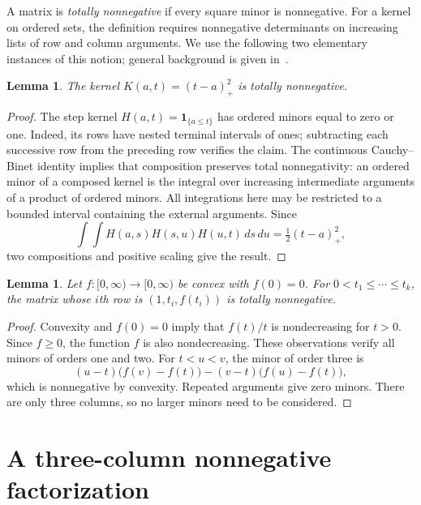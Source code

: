 \documentclass[11pt]{article}
\newtheorem{lemma}[theorem]{Lemma}
\theoremstyle{remark}
\begin{document}
A matrix is \emph{totally nonnegative} if every square minor is nonnegative.
For a kernel on ordered sets, the definition requires nonnegative determinants
on increasing lists of row and column arguments. We use the following two
elementary instances of this notion; general background is given in~\cite{FJ}.

\begin{lemma}\label{lem:truncated}
The kernel $K(a,t)=(t-a)_+^2$ is totally nonnegative.
\end{lemma}
\begin{proof}
The step kernel $H(a,t)=\mathbf1_{\{a\le t\}}$ has ordered minors equal to
zero or one. Indeed, its rows have nested terminal intervals of ones;
subtracting each successive row from the preceding row verifies the claim.
The continuous Cauchy--Binet identity implies that composition preserves total
nonnegativity: an ordered minor of a composed kernel is the integral over
increasing intermediate arguments of a product of ordered minors.
All integrations here may be restricted to a bounded interval containing the
external arguments. Since
\[
 \int\!\!\int H(a,s)H(s,u)H(u,t)\,ds\,du=\tfrac12(t-a)_+^2,
\]
two compositions and positive scaling give the result.
\end{proof}

\begin{lemma}\label{lem:convex}
Let $f:[0,\infty)\to[0,\infty)$ be convex with $f(0)=0$.
For $0<t_1\le\cdots\le t_k$, the matrix whose $i$th row is
$(1,t_i,f(t_i))$ is totally nonnegative.
\end{lemma}
\begin{proof}
Convexity and $f(0)=0$ imply that $f(t)/t$ is nondecreasing for $t>0$.
Since $f\ge0$, the function $f$ is also nondecreasing. These observations
verify all minors of orders one and two.
For $t<u<v$, the minor of order three is
\[
 (u-t)\bigl(f(v)-f(t)\bigr)
 -(v-t)\bigl(f(u)-f(t)\bigr),
\]
which is nonnegative by convexity. Repeated arguments give zero minors.
There are only three columns, so no larger minors need to be considered.
\end{proof}

\section{A three-column nonnegative factorization}\label{sec:kernel}
\end{document}
